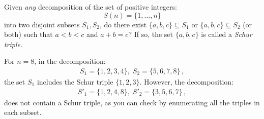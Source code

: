 \begin{definition}
Given \emph{any} decomposition of the set of positive integers:
\[
S(n)=\{1,\ldots,n\}
\]
into two disjoint subsets $S_1,S_2$, do there exist $\{a,b,c\}\subseteq S_1$ or $\{a,b,c\}\subseteq S_2$ (or both) such that $a\!<\!b\!<\!c$ and $a+b=c$? If so, the set $\{a,b,c\}$ is called a \emph{Schur triple}.
\end{definition}

\begin{example} For $n=8$, in the decomposition:
\begin{align}
S_1 = \{1,2,3,4\},\; S_2 = \{5,6,7,8\}\,,
\label{eq.schur0}
\end{align}
the set $S_1$ includes the Schur triple $\{1,2,3\}$.
However, the decomposition:
\begin{align}
S'_1 = \{1,2,4,8\},\; S'_2 = \{3,5,6,7\}\,,
\label{eq:schur1}
\end{align}
does not contain a Schur triple, as you can check by enumerating all the triples in each subset.
\end{example}

